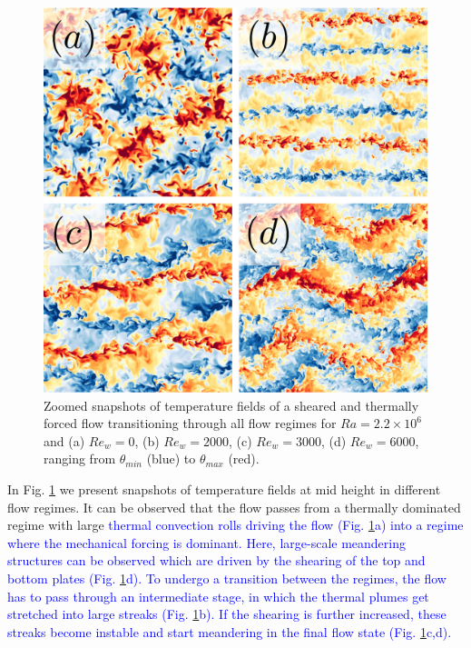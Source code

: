 \documentclass[5p,times]{elsarticle}
\begin{document}

\begin{figure}
	\centering
	\includegraphics[width=0.8\linewidth]{squaredoverview}%
	\caption{\label{fig:overview} Zoomed snapshots of temperature fields
of a sheared and thermally forced flow transitioning through all flow regimes
for $ Ra=2.2 \times 10^6 $ and (a) $ Re_w=0 $, (b) $ Re_w=2000 $, (c) $ Re_w=3000 $, (d) $ Re_w=6000 $, ranging from $ \theta_{min} $ (blue) to $ \theta_{max} $ (red).}
\end{figure}

In Fig. \ref{fig:overview} we present snapshots of temperature
fields at mid height in different flow regimes. It can be observed that the flow passes from a
thermally dominated regime with large \textcolor{blue}{thermal convection rolls driving the flow (Fig. \ref{fig:overview}a) into a
regime where the mechanical forcing is dominant. Here, large-scale meandering
structures can be observed which are driven by the shearing of the top and bottom plates (Fig. \ref{fig:overview}d). To undergo a transition between the
regimes, the flow has to pass through an intermediate stage, in which the thermal plumes
get stretched into large streaks (Fig. \ref{fig:overview}b). If the shearing is
further increased, these streaks become instable and start meandering in the
final flow state (Fig. \ref{fig:overview}c,d).}
\end{document}
